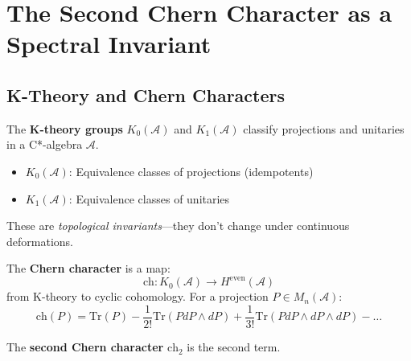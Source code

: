 \section{The Second Chern Character as a Spectral Invariant}

\subsection{K-Theory and Chern Characters}

\begin{definition}\label{def:k-theory}
The \textbf{K-theory groups} $K_0(\mathcal{A})$ and $K_1(\mathcal{A})$ classify projections and unitaries in a C*-algebra $\mathcal{A}$.

\begin{itemize}
\item $K_0(\mathcal{A})$: Equivalence classes of projections (idempotents)
\item $K_1(\mathcal{A})$: Equivalence classes of unitaries
\end{itemize}

These are \textit{topological invariants}---they don't change under continuous deformations.
\end{definition}

\begin{definition}\label{def:chern-character}
The \textbf{Chern character} is a map:
\begin{equation}
\text{ch}: K_0(\mathcal{A}) \to H^{\text{even}}(\mathcal{A})
\end{equation}
from K-theory to cyclic cohomology. For a projection $P \in M_n(\mathcal{A})$:
\begin{equation}
\text{ch}(P) = \text{Tr}(P) - \frac{1}{2!}\text{Tr}(P dP \wedge dP) + \frac{1}{3!}\text{Tr}(P dP \wedge dP \wedge dP) - \ldots
\end{equation}

The \textbf{second Chern character} $\text{ch}_2$ is the second term.
\end{definition}

